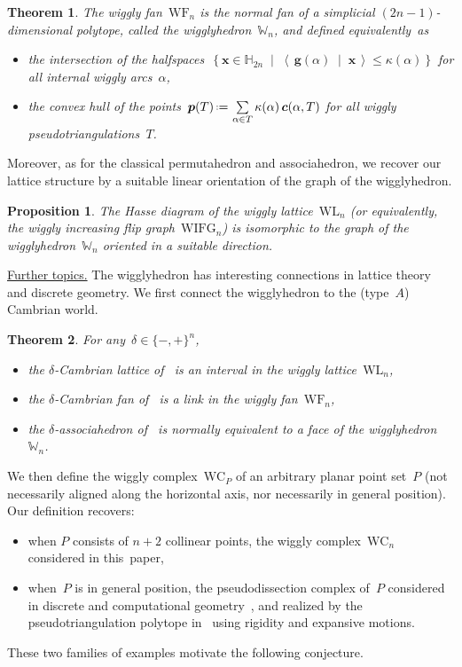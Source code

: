 \documentclass{amsart}
\newtheorem*{theorem*}{Theorem}%
\newtheorem*{proposition*}{Proposition}%
\theoremstyle{definition}
\newcommand{\HH}{\mathbb{H}} %
\renewcommand{\b}[1]{{\boldsymbol{#1}}} %
\newcommand{\set}[2]{\left\{ #1 \;\middle|\; #2 \right\}} %
\newcommand{\dotprod}[2]{\left\langle \, #1 \; \middle| \; #2 \, \right\rangle} %
\newcommand{\eqdef}{\mbox{\,\raisebox{0.2ex}{\scriptsize\ensuremath{\mathrm:}}\ensuremath{=}\,}} %
\newcommand{\darkblue}{\color{darkblue}} %
\newcommand{\defn}[1]{\textsl{\darkblue #1}} %
\newcommand{\para}[1]{\smallskip\noindent\uline{#1.}} %
\newcommand{\polytope}[1]{\mathds{#1}} %
\newcommand{\wigglyComplex}{\mathrm{WC}} %
\newcommand{\wigglyIncreasingFlipGraph}{\mathrm{WIFG}} %
\newcommand{\wigglyLattice}{\mathrm{WL}} %
\newcommand{\wigglyFan}{\mathrm{WF}} %
\newcommand{\wigglyhedron}{\polytope{W}} %
\begin{document}
\begin{theorem*}
The wiggly fan~$\wigglyFan_n$ is the normal fan of a simplicial $(2n-1)$-dimensional polytope, called the \defn{wigglyhedron}~$\wigglyhedron_n$, and defined equivalently~as
\begin{itemize}
\item the intersection of the halfspaces~$\set{\b{x} \!\in\! \HH_{2n}\!}{\!\dotprod{\b{g}(\alpha)}{\b{x}} \!\le\! \kappa(\alpha)}$ for all internal wiggly arcs~$\alpha$,
\item the convex hull of the points~$\b{p}(T) \eqdef \sum\limits_{\alpha \in T} \kappa(\alpha) \, \b{c}(\alpha, T)$ for all wiggly pseudotriangulations~$T$.
\end{itemize}
\end{theorem*}

Moreover, as for the classical permutahedron and associahedron, we recover our lattice structure by a suitable linear orientation of the graph of the wigglyhedron.

\begin{proposition*}
The Hasse diagram of the wiggly lattice~$\wigglyLattice_n$ (or equivalently, the wiggly increasing flip graph~$\wigglyIncreasingFlipGraph_n$) is isomorphic to the graph of the wigglyhedron~$\wigglyhedron_n$ oriented in a suitable direction.
\end{proposition*}

\para{Further topics}
The wigglyhedron has interesting connections in lattice theory and discrete geometry.
We first connect the wigglyhedron to the (type~$A$) Cambrian world.

\begin{theorem*}
For any~$\delta \in \{-,+\}^n$,
\begin{itemize}
\item the $\delta$-Cambrian lattice of~\cite{Reading-CambrianLattices} is an interval in the wiggly lattice~$\wigglyLattice_n$,
\item the $\delta$-Cambrian fan of~\cite{ReadingSpeyer} is a link in the wiggly fan~$\wigglyFan_n$,
\item the $\delta$-associahedron of~\cite{HohlwegLange} is normally equivalent to a face of the wigglyhedron~$\wigglyhedron_n$.
\end{itemize}
\end{theorem*}

We then define the wiggly complex~$\wigglyComplex_P$ of an arbitrary planar point set~$P$ (not necessarily aligned along the horizontal axis, nor necessarily in general position).
Our definition recovers:
\begin{itemize}
\item when $P$ consists of $n+2$ collinear points, the wiggly complex~$\wigglyComplex_n$ considered in this~paper,
\item when~$P$ is in general position, the pseudodissection complex of~$P$ considered in discrete and computational geometry~\cite{PocchiolaVegter,RoteSantosStreinu-pseudotriangulations}, and realized by the pseudotriangulation polytope in~\cite{RoteSantosStreinu-polytope} using rigidity and expansive motions.
\end{itemize}
These two families of examples motivate the following conjecture.
\end{document}
